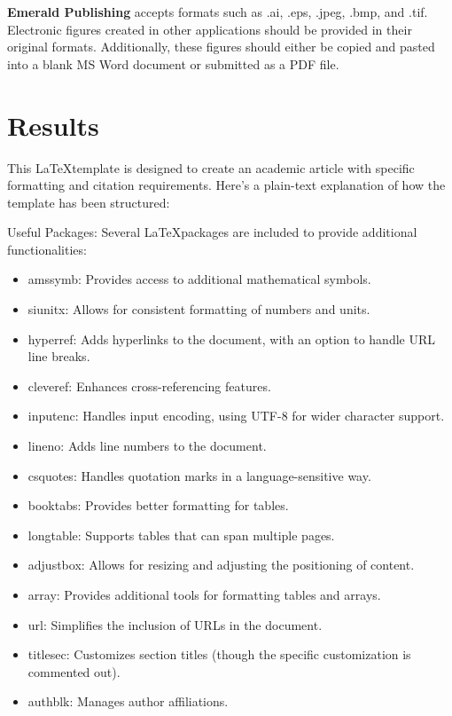 \documentclass{article}
\begin{document}
\textbf{Emerald Publishing} accepts formats such as .ai, .eps, .jpeg, .bmp, and .tif. Electronic figures created in other applications should be provided in their original formats. 
Additionally, these figures should either be copied and pasted into a blank MS Word document or submitted as a PDF file.

\section{Results}
\label{sec:modelling}
This \LaTeX template is designed to create an academic article with specific formatting and citation requirements. Here's a plain-text explanation of how the template has been structured:

Useful Packages:
        Several \LaTeX packages are included to provide additional functionalities:
            \begin{itemize}
                \item amssymb: Provides access to additional mathematical symbols.
                \item siunitx: Allows for consistent formatting of numbers and units.
                \item hyperref: Adds hyperlinks to the document, with an option to handle URL line breaks.
                \item cleveref: Enhances cross-referencing features.
                \item inputenc: Handles input encoding, using UTF-8 for wider character support.
                \item lineno: Adds line numbers to the document.
                \item csquotes: Handles quotation marks in a language-sensitive way.
                \item booktabs: Provides better formatting for tables.
                \item longtable: Supports tables that can span multiple pages.
                \item adjustbox: Allows for resizing and adjusting the positioning of content.
                \item array: Provides additional tools for formatting tables and arrays.
                \item url: Simplifies the inclusion of URLs in the document.
                \item titlesec: Customizes section titles (though the specific customization is commented out).
                \item authblk: Manages author affiliations.
            \end{itemize}
\end{document}
